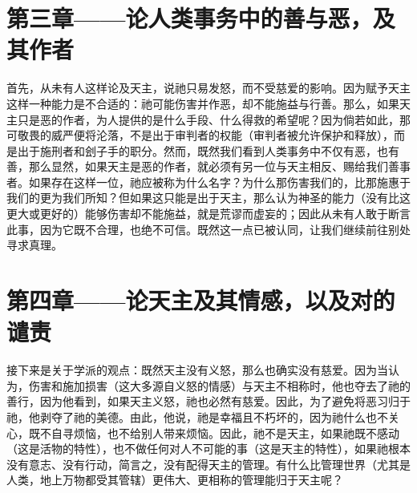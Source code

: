 
\section{第三章——论人类事务中的善与恶，及其作者}

首先，从未有人这样论及天主，说祂只易发怒，而不受慈爱的影响。因为赋予天主这样一种能力是不合适的：祂可能伤害并作恶，却不能施益与行善。那么，如果天主只是恶的作者，为人提供的是什么手段、什么得救的希望呢？因为倘若如此，那可敬畏的威严便将沦落，不是出于审判者的权能（审判者被允许保护和释放），而是出于施刑者和刽子手的职分。然而，既然我们看到人类事务中不仅有恶，也有善，那么显然，如果天主是恶的作者，就必须有另一位与天主相反、赐给我们善事者。如果存在这样一位，祂应被称为什么名字？为什么那伤害我们的，比那施惠于我们的更为我们所知？但如果这只能是出于天主，那么认为神圣的能力（没有比这更大或更好的）能够伤害却不能施益，就是荒谬而虚妄的；因此从未有人敢于断言此事，因为它既不合理，也绝不可信。既然这一点已被认同，让我们继续前往别处寻求真理。\par


\section{第四章——论天主及其情感，以及对的谴责}

接下来是关于学派的观点：既然天主没有义怒，那么也确实没有慈爱。因为当认为，伤害和施加损害（这大多源自义怒的情感）与天主不相称时，他也夺去了祂的善行，因为他看到，如果天主义怒，祂也必然有慈爱。因此，为了避免将恶习归于祂，他剥夺了祂的美德。由此，他说，祂是幸福且不朽坏的，因为祂什么也不关心，既不自寻烦恼，也不给别人带来烦恼。因此，祂不是天主，如果祂既不感动（这是活物的特性），也不做任何对人不可能的事（这是天主的特性），如果祂根本没有意志、没有行动，简言之，没有配得天主的管理。有什么比管理世界（尤其是人类，地上万物都受其管辖）更伟大、更相称的管理能归于天主呢？\par

